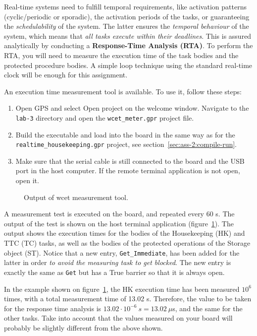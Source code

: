 Real-time systems need to fulfill temporal requirements,
like activation patterns (cyclic/periodic or sporadic),
the activation periods of the tasks,
or guaranteeing the \textit{schedulability} of the system.
The latter ensures the \textit{temporal behaviour} of the system,
which means that \textit{all tasks
execute within their deadlines}.
This is assured analytically by conducting a \textbf{Response-Time Analysis (RTA)}.
To perform the RTA, you will need to measure the execution time of the task bodies and the protected procedure bodies.
A simple loop technique using the standard real-time clock will be enough for this assignment.

An execution time measurement tool is available. To use it, follow these steps:

\begin{enumerate}
\item Open GPS and select Open project on the welcome window. Navigate to the \textcolor{mPurple}{\texttt{lab-3}}
directory and open the \texttt{wcet\_meter.gpr} project file.

\item Build the executable and load into the board in the same way as for the \texttt{realtime\_housekeeping.gpr} project, see section~\ref{sec:ass-2:compile-run}.

\item Make sure that the serial cable is still connected to the board and the USB port in the host
computer. If the remote terminal application is not open, open it.
\end{enumerate}

\begin{figure}[hbtp!]
	\caption{Output of wcet measurement tool.}
	\label{fig:wcet}
\end{figure}

A measurement test is executed on the board, and repeated every 60 s. The output of the test is shown on the host terminal application (figure~\ref{fig:wcet}). The output shows the execution times for the bodies of the Housekeeping (HK) and TTC (TC) tasks, as well as the bodies of the protected operations of the Storage object (ST). Notice that a new entry, \texttt{Get\_Immediate},
has been added for the latter in order \textit{to avoid the measuring task to get blocked}.
The new entry is exactly the same as \texttt{Get} but has a True barrier so that it is always open.

In the example shown on figure~\ref{fig:wcet}, the HK execution time has been measured $10^{6}$ times, with a total measurement time of 13.02 s. Therefore, the value to be taken for the response time analysis is $13.02\cdot10^{-6}~s = 13.02~\mu${s}, and the same for the other tasks. Take into account that the values measured on your board will probably be slightly different from the above shown.


